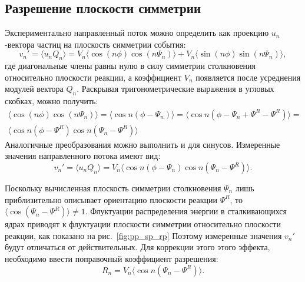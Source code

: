 \subsection{Разрешение плоскости симметрии}

Экспериментально направленный поток можно определить как проекцию $u_n$-вектора частиц на плоскость симметрии события:
%
\begin{equation}
    v_n' =  \langle u_n Q_n \rangle = 
    V_n \langle \cos (n\phi) \cos (n\Psi_n) \rangle + V_n \langle \sin(n\phi) \sin(n\Psi_n) \rangle,
\end{equation}
%
где диагональные члены равны нулю в силу симметрии столкновения относительно плоскости реакции, а коэффициент $V_n$ появляется после усреднения модулей вектора $Q_n$.
Раскрывая тригонометрические выражения в угловых скобках, можно получить:
%
\begin{equation}
\begin{align}
    \langle \cos (n\phi) \cos (n\Psi_n) \rangle = \langle \cos n ( \phi - \Psi_n ) \rangle
    = \langle \cos n ( \phi - \Psi_n + \Psi^R - \Psi^R ) \rangle = \\
    \langle \cos n ( \phi - \Psi^R ) \cos n (\Psi_n - \Psi^R ) \rangle
\end{align}
\end{equation}
%
Аналогичные преобразования можно выполнить и для синусов. 
Измеренные значения направленного потока имеют вид:
%
\begin{equation}
    v_n' =  \langle u_n Q_n \rangle = 
    V_n \langle \cos n ( \phi - \Psi_n ) \cos n (\Psi_n - \Psi^R) \rangle.
    \label{eq:uq_transformation}
\end{equation}
%

Поскольку вычисленная плоскость симметрии столкновения $\Psi_n$ лишь приблизительно описывает ориентацию плоскости реакции $\Psi^R$, то $ \langle \cos(\Psi_n - \Psi^R) \rangle \ne 1 $.
Флуктуации распределения энергии в сталкивающихся ядрах приводят к флуктуации плоскости симметрии относительно плоскости реакции, как показано на рис.~\ref{fig:pp_sp_rp}
Поэтому измеренные значения $v_n'$ будут отличаться от действительных.
Для коррекции этого этого эффекта, необходимо ввести поправочный коэффициент разрешения:
%
\begin{equation}
    R_n = V_n \langle \cos n (\Psi_n - \Psi^R) \rangle.
\end{equation}
%


